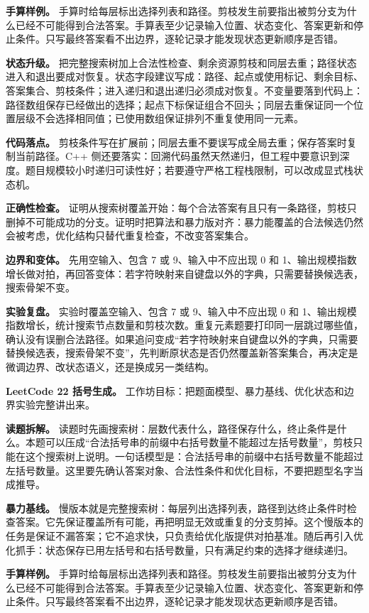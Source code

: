 \textbf{手算样例。} 手算时给每层标出选择列表和路径。剪枝发生前要指出被剪分支为什么已经不可能得到合法答案。手算表至少记录输入位置、状态变化、答案更新和停止条件。只写最终答案看不出边界，逐轮记录才能发现状态更新顺序是否错。

\textbf{状态升级。} 把完整搜索树加上合法性检查、剩余资源剪枝和同层去重；路径状态进入和退出要成对恢复。状态字段建议写成：路径、起点或使用标记、剩余目标、答案集合、剪枝条件；进入递归和退出递归必须成对恢复。不变量要落到代码上：路径数组保存已经做出的选择；起点下标保证组合不回头；同层去重保证同一个位置层级不会选择相同值；已使用数组保证排列不重复使用同一元素。

\textbf{代码落点。} 剪枝条件写在扩展前；同层去重不要误写成全局去重；保存答案时复制当前路径。C++ 侧还要落实：回溯代码虽然天然递归，但工程中要意识到深度。题目规模较小时递归可读性好；若要遵守严格工程栈限制，可以改成显式栈状态机。

\textbf{正确性检查。} 证明从搜索树覆盖开始：每个合法答案有且只有一条路径，剪枝只删掉不可能成功的分支。证明时把算法和暴力版对齐：暴力能覆盖的合法候选仍然会被考虑，优化结构只替代重复检查，不改变答案集合。

\textbf{边界和变体。} 先用空输入、包含 7 或 9、输入中不应出现 0 和 1、输出规模指数增长做对拍，再回答变体：若字符映射来自键盘以外的字典，只需要替换候选表，搜索骨架不变。

\textbf{实验复盘。} 实验时覆盖空输入、包含 7 或 9、输入中不应出现 0 和 1、输出规模指数增长，统计搜索节点数量和剪枝次数。重复元素题要打印同一层跳过哪些值，确认没有误删合法路径。如果追问变成“若字符映射来自键盘以外的字典，只需要替换候选表，搜索骨架不变”，先判断原状态是否仍然覆盖新答案集合，再决定是微调边界、改状态语义，还是换成另一类结构。

\noindent\textbf{LeetCode 22 括号生成。} 工作坊目标：把题面模型、暴力基线、优化状态和边界实验完整讲出来。

\textbf{读题拆解。} 读题时先画搜索树：层数代表什么，路径保存什么，终止条件是什么。本题可以压成“合法括号串的前缀中右括号数量不能超过左括号数量”，剪枝只能在这个搜索树上说明。一句话模型是：合法括号串的前缀中右括号数量不能超过左括号数量。这里要先确认答案对象、合法性条件和优化目标，不要把题型名字当成推导。

\textbf{暴力基线。} 慢版本就是完整搜索树：每层列出选择列表，路径到达终止条件时检查答案。它先保证覆盖所有可能，再把明显无效或重复的分支剪掉。这个慢版本的任务是保证不漏答案；它不追求快，只负责给优化版提供对拍基准。随后再引入优化抓手：状态保存已用左括号和右括号数量，只有满足约束的选择才继续递归。

\textbf{手算样例。} 手算时给每层标出选择列表和路径。剪枝发生前要指出被剪分支为什么已经不可能得到合法答案。手算表至少记录输入位置、状态变化、答案更新和停止条件。只写最终答案看不出边界，逐轮记录才能发现状态更新顺序是否错。

